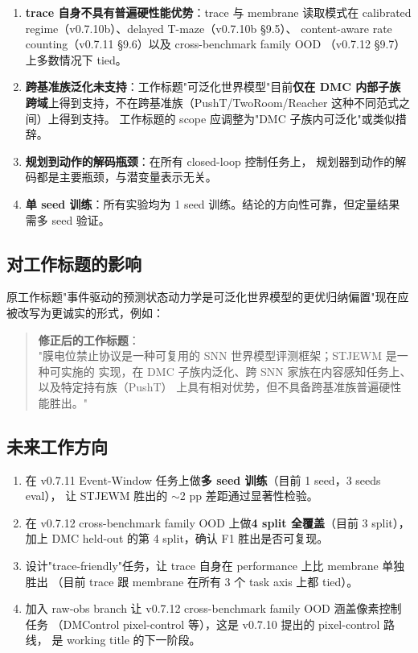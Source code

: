 \documentclass[11pt,a4paper]{article}
\begin{document}
\begin{enumerate}
    \item \textbf{trace 自身不具有普遍硬性能优势}：trace 与 membrane 读取模式在
    calibrated regime（v0.7.10b）、delayed T-maze（v0.7.10b §9.5）、
    content-aware rate counting（v0.7.11 §9.6）以及 cross-benchmark family OOD
    （v0.7.12 §9.7）上多数情况下 tied。

    \item \textbf{跨基准族泛化未支持}：工作标题"可泛化世界模型"目前\textbf{仅在 DMC 内部子族
    跨域}上得到支持，不在跨基准族（PushT/TwoRoom/Reacher 这种不同范式之间）上得到支持。
    工作标题的 scope 应调整为"DMC 子族内可泛化"或类似措辞。

    \item \textbf{规划到动作的解码瓶颈}：在所有 closed-loop 控制任务上，
    规划器到动作的解码都是主要瓶颈，与潜变量表示无关。

    \item \textbf{单 seed 训练}：所有实验均为 1 seed 训练。结论的方向性可靠，但定量结果
    需多 seed 验证。
\end{enumerate}

\subsection{对工作标题的影响}

原工作标题"事件驱动的预测状态动力学是可泛化世界模型的更优归纳偏置"现在应
被改写为更诚实的形式，例如：

\begin{quote}
\textbf{修正后的工作标题}：\\
"膜电位禁止协议是一种可复用的 SNN 世界模型评测框架；STJEWM 是一种可实施的
实现，在 DMC 子族内泛化、跨 SNN 家族在内容感知任务上、以及特定持有族（PushT）
上具有相对优势，但不具备跨基准族普遍硬性能胜出。"
\end{quote}

\subsection{未来工作方向}

\begin{enumerate}
    \item 在 v0.7.11 Event-Window 任务上做\textbf{多 seed 训练}（目前 1 seed，3 seeds eval），
    让 STJEWM 胜出的 $\sim$2 pp 差距通过显著性检验。
    \item 在 v0.7.12 cross-benchmark family OOD 上做\textbf{4 split 全覆盖}（目前 3 split），
    加上 DMC held-out 的第 4 split，确认 F1 胜出是否可复现。
    \item 设计"trace-friendly"任务，让 trace 自身在 performance 上比 membrane 单独胜出
    （目前 trace 跟 membrane 在所有 3 个 task axis 上都 tied）。
    \item 加入 raw-obs branch 让 v0.7.12 cross-benchmark family OOD 涵盖像素控制任务
    （DMControl pixel-control 等），这是 v0.7.10 提出的 pixel-control 路线，
    是 working title 的下一阶段。
\end{enumerate}
\end{document}
